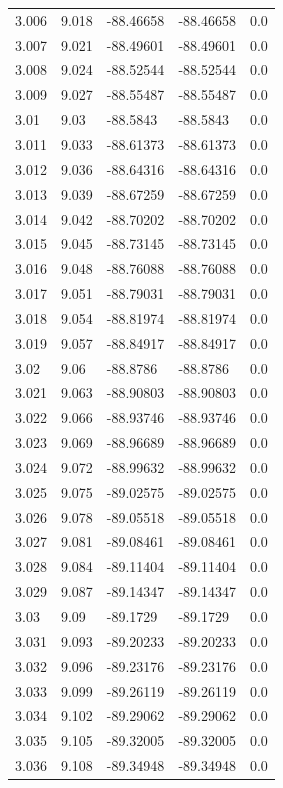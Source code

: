\begin{tabular}{lllll}
3.006 & 9.018 & -88.46658 & -88.46658 & 0.0 \\
3.007 & 9.021 & -88.49601 & -88.49601 & 0.0 \\
3.008 & 9.024 & -88.52544 & -88.52544 & 0.0 \\
3.009 & 9.027 & -88.55487 & -88.55487 & 0.0 \\
3.01 & 9.03 & -88.5843 & -88.5843 & 0.0 \\
3.011 & 9.033 & -88.61373 & -88.61373 & 0.0 \\
3.012 & 9.036 & -88.64316 & -88.64316 & 0.0 \\
3.013 & 9.039 & -88.67259 & -88.67259 & 0.0 \\
3.014 & 9.042 & -88.70202 & -88.70202 & 0.0 \\
3.015 & 9.045 & -88.73145 & -88.73145 & 0.0 \\
3.016 & 9.048 & -88.76088 & -88.76088 & 0.0 \\
3.017 & 9.051 & -88.79031 & -88.79031 & 0.0 \\
3.018 & 9.054 & -88.81974 & -88.81974 & 0.0 \\
3.019 & 9.057 & -88.84917 & -88.84917 & 0.0 \\
3.02 & 9.06 & -88.8786 & -88.8786 & 0.0 \\
3.021 & 9.063 & -88.90803 & -88.90803 & 0.0 \\
3.022 & 9.066 & -88.93746 & -88.93746 & 0.0 \\
3.023 & 9.069 & -88.96689 & -88.96689 & 0.0 \\
3.024 & 9.072 & -88.99632 & -88.99632 & 0.0 \\
3.025 & 9.075 & -89.02575 & -89.02575 & 0.0 \\
3.026 & 9.078 & -89.05518 & -89.05518 & 0.0 \\
3.027 & 9.081 & -89.08461 & -89.08461 & 0.0 \\
3.028 & 9.084 & -89.11404 & -89.11404 & 0.0 \\
3.029 & 9.087 & -89.14347 & -89.14347 & 0.0 \\
3.03 & 9.09 & -89.1729 & -89.1729 & 0.0 \\
3.031 & 9.093 & -89.20233 & -89.20233 & 0.0 \\
3.032 & 9.096 & -89.23176 & -89.23176 & 0.0 \\
3.033 & 9.099 & -89.26119 & -89.26119 & 0.0 \\
3.034 & 9.102 & -89.29062 & -89.29062 & 0.0 \\
3.035 & 9.105 & -89.32005 & -89.32005 & 0.0 \\
3.036 & 9.108 & -89.34948 & -89.34948 & 0.0 \\

\end{tabular}
